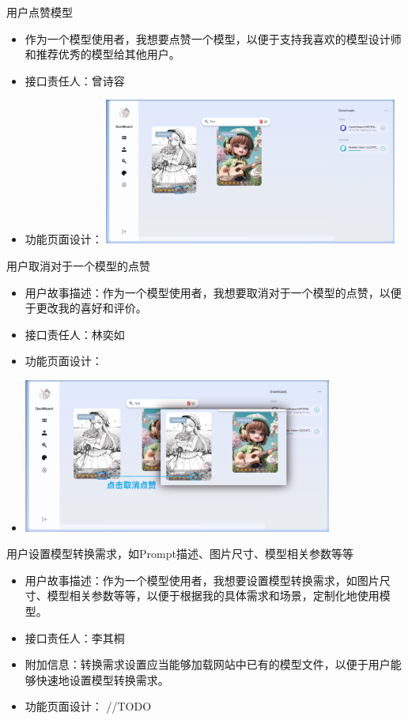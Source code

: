 \begin{frame}{用户点赞模型}
    \begin{itemize}
        \item 作为一个模型使用者，我想要点赞一个模型，以便于支持我喜欢的模型设计师和推荐优秀的模型给其他用户。
        \item 接口责任人：曾诗容
        \item 功能页面设计： %
        \includegraphics[width=3.8in]{contents/figure/like_model_demo.png}
    \end{itemize}
\end{frame}

\begin{frame}{用户取消对于一个模型的点赞}
    \begin{itemize}
        \item 用户故事描述：作为一个模型使用者，我想要取消对于一个模型的点赞，以便于更改我的喜好和评价。
        \item 接口责任人：林奕如
        \item 功能页面设计：
        \item \includegraphics[width=0.8\textwidth]{contents/figure/model_remove_liked.png}
    \end{itemize}
\end{frame}

\begin{frame}{用户设置模型转换需求，如Prompt描述、图片尺寸、模型相关参数等等}
    \begin{itemize}
        \item 用户故事描述：作为一个模型使用者，我想要设置模型转换需求，如图片尺寸、模型相关参数等等，以便于根据我的具体需求和场景，定制化地使用模型。
        \item 接口责任人：李其桐
        \item 附加信息：转换需求设置应当能够加载网站中已有的模型文件，以便于用户能够快速地设置模型转换需求。
        \item 功能页面设计： //TODO
    \end{itemize}
\end{frame}

